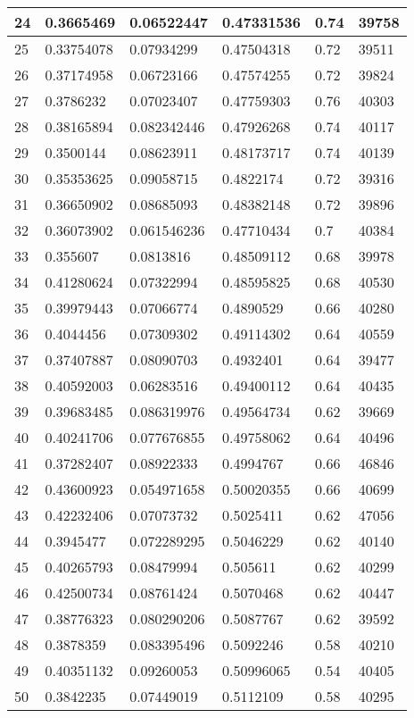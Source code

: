 \begin{longtable}{|l|l|l|l|l|l|}
24 & 0.3665469 & 0.06522447 & 0.47331536 & 0.74 & 39758 \\ \hline 
25 & 0.33754078 & 0.07934299 & 0.47504318 & 0.72 & 39511 \\ \hline 
26 & 0.37174958 & 0.06723166 & 0.47574255 & 0.72 & 39824 \\ \hline 
27 & 0.3786232 & 0.07023407 & 0.47759303 & 0.76 & 40303 \\ \hline 
28 & 0.38165894 & 0.082342446 & 0.47926268 & 0.74 & 40117 \\ \hline 
29 & 0.3500144 & 0.08623911 & 0.48173717 & 0.74 & 40139 \\ \hline 
30 & 0.35353625 & 0.09058715 & 0.4822174 & 0.72 & 39316 \\ \hline 
31 & 0.36650902 & 0.08685093 & 0.48382148 & 0.72 & 39896 \\ \hline 
32 & 0.36073902 & 0.061546236 & 0.47710434 & 0.7 & 40384 \\ \hline 
33 & 0.355607 & 0.0813816 & 0.48509112 & 0.68 & 39978 \\ \hline 
34 & 0.41280624 & 0.07322994 & 0.48595825 & 0.68 & 40530 \\ \hline 
35 & 0.39979443 & 0.07066774 & 0.4890529 & 0.66 & 40280 \\ \hline 
36 & 0.4044456 & 0.07309302 & 0.49114302 & 0.64 & 40559 \\ \hline 
37 & 0.37407887 & 0.08090703 & 0.4932401 & 0.64 & 39477 \\ \hline 
38 & 0.40592003 & 0.06283516 & 0.49400112 & 0.64 & 40435 \\ \hline 
39 & 0.39683485 & 0.086319976 & 0.49564734 & 0.62 & 39669 \\ \hline 
40 & 0.40241706 & 0.077676855 & 0.49758062 & 0.64 & 40496 \\ \hline 
41 & 0.37282407 & 0.08922333 & 0.4994767 & 0.66 & 46846 \\ \hline 
42 & 0.43600923 & 0.054971658 & 0.50020355 & 0.66 & 40699 \\ \hline 
43 & 0.42232406 & 0.07073732 & 0.5025411 & 0.62 & 47056 \\ \hline 
44 & 0.3945477 & 0.072289295 & 0.5046229 & 0.62 & 40140 \\ \hline 
45 & 0.40265793 & 0.08479994 & 0.505611 & 0.62 & 40299 \\ \hline 
46 & 0.42500734 & 0.08761424 & 0.5070468 & 0.62 & 40447 \\ \hline 
47 & 0.38776323 & 0.080290206 & 0.5087767 & 0.62 & 39592 \\ \hline 
48 & 0.3878359 & 0.083395496 & 0.5092246 & 0.58 & 40210 \\ \hline 
49 & 0.40351132 & 0.09260053 & 0.50996065 & 0.54 & 40405 \\ \hline 
50 & 0.3842235 & 0.07449019 & 0.5112109 & 0.58 & 40295 \\ \hline 
\end{longtable}